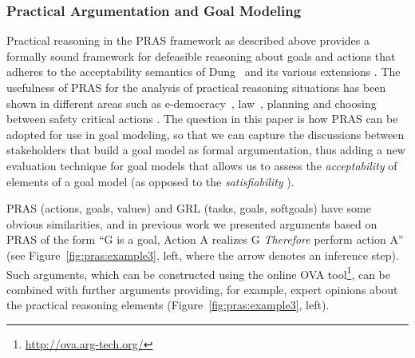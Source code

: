 \subsubsection{Practical Argumentation and Goal Modeling}
\label{sect:background:pras:motivation}

Practical reasoning in the PRAS framework as described above provides a formally sound framework for defeasible reasoning about goals and actions that adheres to the acceptability semantics of Dung~\cite{Dung1995} and its various extensions \cite{amgoud2002reasoning,modgil2009}. The usefulness of PRAS for the analysis of practical reasoning situations has been shown in different areas such as e-democracy~\cite{cartwright2009IS}, law~\cite{atkinson2005legal}, planning \cite{medellin2013planning} and choosing between safety critical actions \cite{tolchinsky2012deliberation}. The question in this paper is how PRAS can be adopted for use in goal modeling, so that we can capture the discussions between stakeholders that build a goal model as formal argumentation, thus adding a new evaluation technique for goal models that allows us to assess the \emph{acceptability} of elements of a goal model (as opposed to the \emph{satisfiability} \cite{}).


PRAS (actions, goals, values) and GRL (tasks, goals, softgoals) have some obvious similarities, and in previous work \cite{vanzee-etal:renext2015,vanZee-etal:er2016,vanZee-etal:comma2016} we presented arguments based on PRAS of the form ``G is a goal, Action A realizes G \emph{Therefore} perform action A'' (see Figure~\ref{fig:pras:example3}, left, where the arrow denotes an inference step). Such arguments, which can be constructed using the online OVA tool\footnote{\url{http://ova.arg-tech.org/}}, can be combined with further arguments providing, for example, expert opinions about the practical reasoning elements (Figure~\ref{fig:pras:example3}, left).

